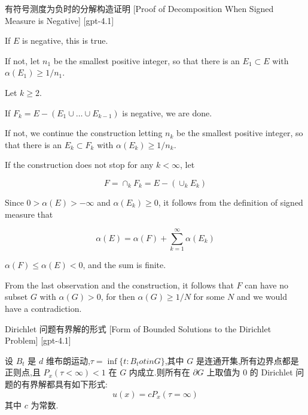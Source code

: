 \documentclass[UTF8]{ctexart}
\begin{document}
    \begin{prf}
        {有符号测度为负时的分解构造证明}
        [Proof of Decomposition When Signed Measure is Negative]
        [gpt-4.1]
        
If $E$ is negative, this is true.

If not, let $n_{1}$ be the smallest positive integer, so that there is an $E_{1} \subset E$ with $\alpha(E_{1}) \geq 1 / n_{1}$.

Let $k \geq 2$.

If $F_{k} = E - (E_{1} \cup \dots \cup E_{k-1})$ is negative, we are done.

If not, we continue the construction letting $n_{k}$ be the smallest positive integer, so that there is an $E_{k} \subset F_{k}$ with $\alpha(E_{k}) \geq 1 / n_{k}$.

If the construction does not stop for any $k < \infty$, let

\[
F = \cap_{k} F_{k} = E - (\cup_{k} E_{k})
\]

Since $0 > \alpha(E) > -\infty$ and $\alpha(E_{k}) \geq 0$, it follows from the definition of signed measure that

\[
\alpha(E) = \alpha(F) + \sum_{k=1}^{\infty} \alpha(E_{k})
\]

$\alpha(F) \leq \alpha(E) < 0$, and the sum is finite.

From the last observation and the construction, it follows that $F$ can have no subset $G$ with $\alpha(G) > 0$, for then $\alpha(G) \geq 1 / N$ for some $N$ and we would have a contradiction.

    \end{prf}
    
    
    
    \begin{thm}
        {Dirichlet 问题有界解的形式}
        [Form of Bounded Solutions to the Dirichlet Problem]
        [gpt-4.1]
        
设 $B_t$ 是 $d$ 维布朗运动,$\tau = \operatorname{inf}\{ t : B_t 
otin G \}$,其中 $G$ 是连通开集,所有边界点都是正则点,且 $P_x(\tau < \infty) < 1$ 在 $G$ 内成立.则所有在 $\partial G$ 上取值为 $0$ 的 Dirichlet 问题的有界解都具有如下形式:
\[
u(x) = c P_x(\tau = \infty)
\]
其中 $c$ 为常数.

    \end{thm}
    
    
    
\end{document}

